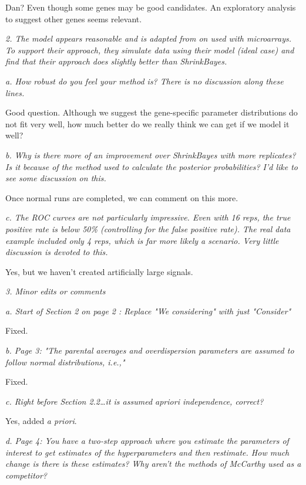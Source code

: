 \documentclass{article}
\newcommand{\comment}[1]{\textit{#1}}
\newcommand{\response}[1]{#1}
\newcommand{\todo}[1]{{\color{red} #1}}
\begin{document}
\todo{Dan? Even though some genes may be good candidates. An exploratory analysis to suggest other genes seems relevant.}

\comment{2. The model appears reasonable and is adapted from on used with microarrays.  To support their approach, they simulate data using their model (ideal case) and find that their approach does slightly better than ShrinkBayes.}

\comment{a. How robust do you feel your method is?  There is no discussion along these lines.}

\todo{Good question. Although we suggest the gene-specific parameter distributions do not fit very well, how much better do we really think we can get if we model it well?}

\comment{b.      Why is there more of an improvement over ShrinkBayes with more replicates?  Is it because of the method used to calculate the posterior probabilities?  I'd like to see some discussion on this.}

\todo{Once normal runs are completed, we can comment on this more.}

\comment{c.      The ROC curves are not particularly impressive.  Even with 16 reps, the true positive rate is below 50\% (controlling for the false positive rate).  The real data example included only 4 reps, which is far more likely a scenario.  Very little discussion is devoted to this.}

\todo{Yes, but we haven't created artificially large signals.}

\comment{3.      Minor edits or comments}

\comment{a.      Start of Section 2 on page 2  :  Replace "We considering" with just "Consider"}

\response{Fixed.}

\comment{b.      Page 3: "The parental averages and overdispersion parameters are assumed to follow normal distributions, i.e.,"}

\response{Fixed.}

\comment{c.      Right before Section 2.2…it is assumed apriori independence, correct?}

\response{Yes, added \emph{a priori}.}

\comment{d.      Page 4: You have a two-step approach where you estimate the parameters of interest to get estimates of the hyperparameters and then restimate.  How much change is there is these estimates?  Why aren't the methods of McCarthy used as a competitor?}
\end{document}
